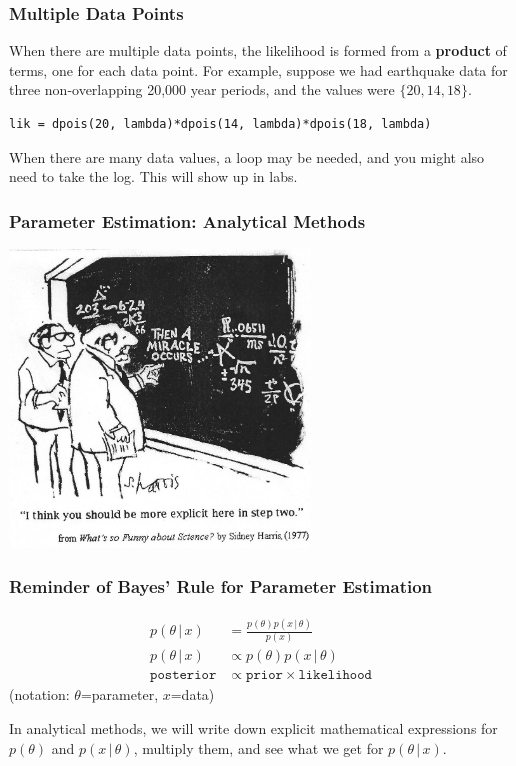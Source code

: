 \documentclass{beamer}
\newcommand{\given}{\,|\,}
\begin{document}
\begin{frame}[fragile]
\frametitle{Multiple Data Points}
When there are multiple data points, the likelihood is formed from a
{\bf product} of terms, one for each data point.
For example, suppose we had earthquake data for
three non-overlapping 20,000 year periods, and the values were
$\{20, 14, 18\}$.\pause
\begin{verbatim}
lik = dpois(20, lambda)*dpois(14, lambda)*dpois(18, lambda)
\end{verbatim}
\pause
When there are many data values, a loop may be needed, and you might
also need to take the log. This will show up in labs.

\end{frame}




\begin{frame}
\frametitle{Parameter Estimation: Analytical Methods}

\begin{center}
\includegraphics[width=0.6\textwidth]{images/miracle.jpg}
\end{center}

\end{frame}

\begin{frame}
\frametitle{Reminder of Bayes' Rule for Parameter Estimation}

\begin{align}
p(\theta \given x) &= \frac{p(\theta)p(x \given \theta)}{p(x)} \\
p(\theta \given x) &\propto p(\theta)p(x \given \theta) \\
\texttt{posterior} &\propto \texttt{prior} \times \texttt{likelihood}
\end{align}
(notation: $\theta$=parameter, $x$=data)\pause

In analytical methods, we will write down explicit mathematical expressions
for $p(\theta)$ and $p(x \given \theta)$, multiply them, and see what we
get for $p(\theta \given x)$.

\end{frame}
\end{document}
